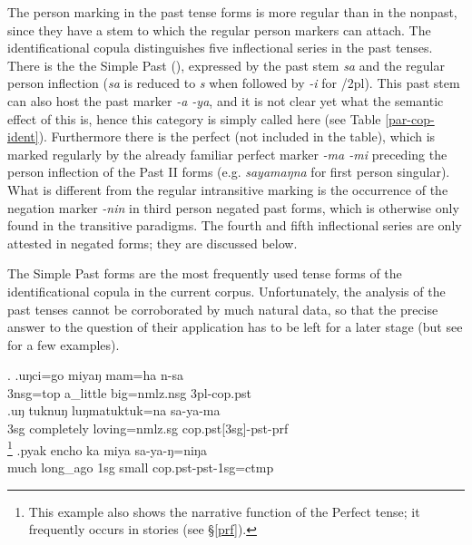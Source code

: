 The person marking in the past tense forms is more regular than in the nonpast, since they have a stem to which the regular person markers can attach. The identificational copula distinguishes five inflectional series in the past tenses. There is the the Simple Past (), expressed by the past stem \emph{sa} and the regular person inflection (\emph{sa} is reduced to \emph{s} when followed by \emph{-i} for {/2pl}). This past stem can also host the past marker \emph{-a \ti -ya}, and it is not clear yet what the semantic effect of this is, hence this category is simply called  here (see Table \ref{par-cop-ident}). Furthermore there is the perfect (not included in the table), which is marked regularly by the already familiar perfect marker \emph{-ma \ti -mi} preceding the person inflection of the Past II forms (e.g. \emph{sayamaŋna}  for first person singular). What is  different from the regular intransitive marking is the occurrence of the negation marker \emph{-nin} in third person negated past forms, which is otherwise only found in the transitive paradigms. The fourth and fifth inflectional series are only attested in negated forms; they are discussed below.  


The Simple Past forms are the most frequently used tense forms of the identificational copula in the current corpus. Unfortunately, the  analysis of the past tenses cannot be corroborated by much natural data, so that the precise answer to the question of their application has to be left for a later stage (but see \Next for a few examples).

\ex. \ag.uŋci=go     miyaŋ mam=ha n-sa \\
{\sc 3nsg=top} a\_little big{\sc =nmlz.nsg} {\sc 3pl-cop.pst}\\
\bg.uŋ tuknuŋ    luŋmatuktuk=na        sa-ya-ma\\
{\sc 3sg} completely loving{\sc =nmlz.sg} {\sc cop.pst[3sg]-pst-prf}\\
\footnote{This example also shows the narrative function of the Perfect tense; it frequently occurs in stories (see §\ref{prf}).}  
\bg.pyak encho         ka  miya   sa-ya-ŋ=niŋa\\
much long\_ago {\sc 1sg} small {\sc cop.pst-pst-1sg=ctmp}\\
 
 
